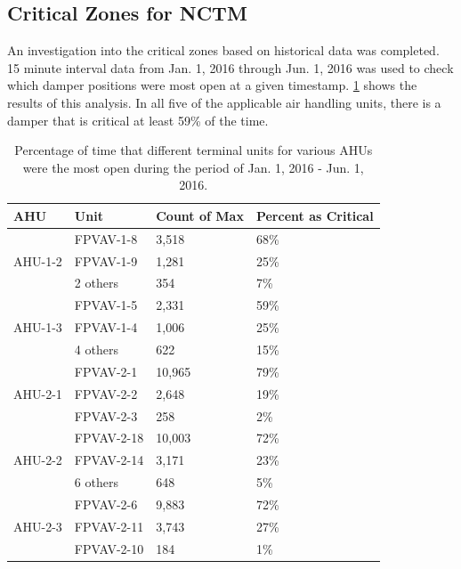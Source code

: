 \subsection{Critical Zones for NCTM}

An investigation into the critical zones based on historical data was
completed. 15 minute interval data from Jan. 1, 2016 through Jun. 1,
2016 was used to check which damper positions were most open at a given
timestamp. \tableref{} \ref{tab:AHU12CriticalZone} shows the results of
this analysis. In all five of the applicable air handling units, there
is a damper that is critical at least 59\% of the time. 

\begin{table}
\centering
\caption{Percentage of time that different terminal units for various AHUs were the most open during the period of Jan. 1, 2016 - Jun. 1, 2016.}
\label{tab:AHU12CriticalZone}
\begin{tabular}{@{}llll@{}}
\toprule
AHU                          & Unit       & Count of Max & Percent as Critical \\ \midrule
\multirow{3}{*}{AHU-1-2}     & FPVAV-1-8  & 3,518        & 68\%                             \\
                             & FPVAV-1-9  & 1,281        & 25\%                             \\
                             & 2 others   & 354          & 7\%                 \\ \midrule
\multirow{3}{*}{AHU-1-3}     & FPVAV-1-5  & 2,331        & 59\%                             \\
                             & FPVAV-1-4  & 1,006        & 25\%                             \\
                             & 4 others   & 622          & 15\%                 \\ \midrule
\multirow{3}{*}{AHU-2-1}     & FPVAV-2-1  & 10,965       & 79\%                             \\
                             & FPVAV-2-2  & 2,648        & 19\%                             \\
                             & FPVAV-2-3  & 258          & 2\% \\ \midrule
\multirow{3}{*}{AHU-2-2}     & FPVAV-2-18 & 10,003       & 72\%                             \\
                             & FPVAV-2-14 & 3,171        & 23\%                             \\
                             & 6 others   & 648          & 5\%  \\ \midrule
\multirow{3}{*}{AHU-2-3}     & FPVAV-2-6  & 9,883        & 72\%                             \\
                             & FPVAV-2-11 & 3,743        & 27\%                             \\
                             & FPVAV-2-10 & 184          & 1\%  \\ \midrule
\end{tabular}
\end{table}


